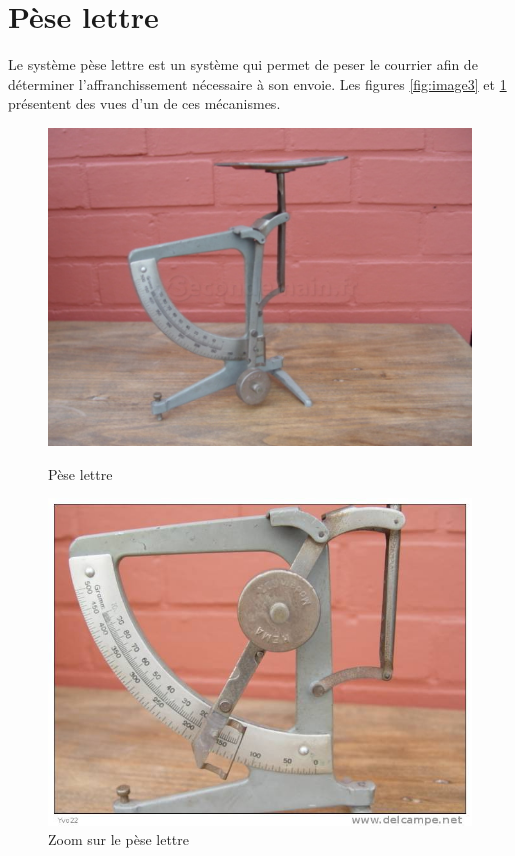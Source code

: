 \newpage

\section{Pèse lettre}

Le système pèse lettre est un système qui permet de peser le courrier afin de déterminer l'affranchissement nécessaire à son envoie. Les figures \ref{fig:image3} et \ref{fig:image4} présentent des vues d'un de ces mécanismes.

\begin{figure}[htbp]
\begin{minipage}[c]{.48\linewidth}
\begin{center}
\includegraphics[width=\linewidth]{img/pl_face.jpg}
\caption{Pèse lettre}
\label{fig:image3}
\end{center}
\end{minipage}
\hfill
\begin{minipage}[c]{.48\linewidth}
\begin{center}
\includegraphics[width=\linewidth]{img/pl_zoom.jpg}
\caption{Zoom sur le pèse lettre}
\label{fig:image4}
\end{center}
\end{minipage}
\end{figure}

